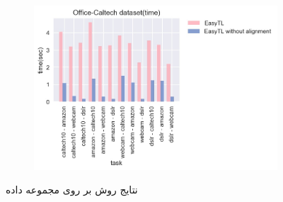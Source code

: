 \begin{figure}
\begin{subfigure}[b]{0.35\textwidth}
		\caption{}
	\end{subfigure}%
	\begin{subfigure}[b]{0.35\textwidth}
		\centering
		\includegraphics[width=\linewidth]{images/3_3.jpg}
		\caption{}
	\end{subfigure}%
	\caption{
		نتایج روش
		بر روی مجموعه داده
		\textit{}
	}
	\label{fig:3}
\end{figure}

